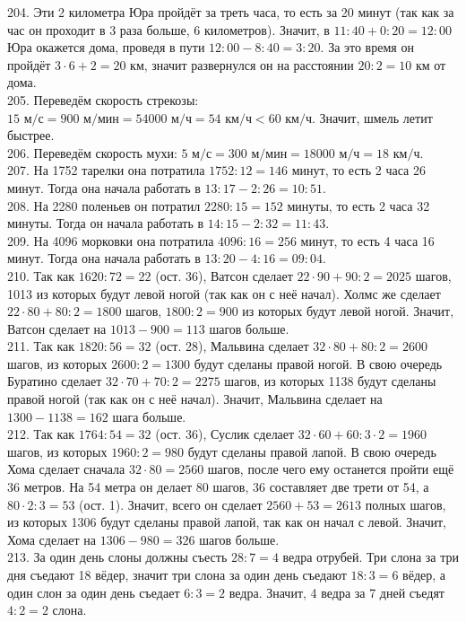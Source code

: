 204. Эти 2 километра Юра пройдёт за треть часа, то есть за 20 минут (так как за час он проходит в 3 раза больше, 6 километров). Значит, в $11:40+0:20=12:00$ Юра окажется дома, проведя в пути $12:00-8:40=3:20.$ За это время он пройдёт $3\cdot6+2=20$ км, значит развернулся он на расстоянии $20:2=10$ км от дома.\\
205. Переведём скорость стрекозы: $15\text{ м/с}=900\text{ м/мин}=54000\text{ м/ч}=54\text{ км/ч}<60\text{ км/ч}.$ Значит, шмель летит быстрее.\\
206. Переведём скорость мухи: $5\text{ м/с}=300\text{ м/мин}=18000\text{ м/ч}=18\text{ км/ч}.$\\
207. На 1752 тарелки она потратила $1752:12=146$ минут, то есть 2 часа 26 минут. Тогда она начала работать в  $13:17-2:26=10:51.$\\
208. На 2280 поленьев он потратил $2280:15=152$ минуты, то есть 2 часа 32 минуты. Тогда он начала работать в  $14:15-2:32=11:43.$\\
209. На 4096 морковки она потратила $4096:16=256$ минут, то есть 4 часа 16 минут. Тогда она начала работать в  $13:20-4:16=09:04.$\\
210. Так как $1620:72=22$ (ост. 36), Ватсон сделает $22\cdot90+90:2=2025$ шагов, 1013 из которых будут левой ногой (так как он с неё начал). Холмс же сделает $22\cdot80+80:2=1800$ шагов, $1800:2=900$ из которых будут левой ногой. Значит, Ватсон сделает на $1013-900=113$ шагов больше.\\
211. Так как $1820:56=32$ (ост. 28), Мальвина сделает $32\cdot80+80:2=2600$ шагов, из которых $2600:2=1300$ будут сделаны правой ногой. В свою очередь Буратино сделает $32\cdot70+70:2=2275$ шагов, из которых 1138 будут сделаны правой ногой (так как он с неё начал). Значит, Мальвина сделает на $1300-1138=162$ шага больше.\\
212. Так как $1764:54=32$ (ост. 36), Суслик сделает $32\cdot60+60:3\cdot2=1960$ шагов, из которых $1960:2=980$ будут сделаны правой лапой. В свою очередь Хома сделает сначала $32\cdot80=2560$ шагов, после чего ему останется пройти ещё 36 метров. На 54 метра он делает 80 шагов, 36 составляет две трети от 54, а  $80\cdot2:3=53$ (ост. 1). Значит, всего он сделает $2560+53=2613$ полных шагов, из которых 1306 будут сделаны правой лапой, так как он начал с левой. Значит, Хома сделает на $1306-980=326$ шагов больше.\\
213. За один день слоны должны съесть $28:7=4$ ведра отрубей. Три слона за три дня съедают 18 вёдер, значит три слона за один день съедают $18:3=6$ вёдер, а один слон за один день съедает $6:3=2$ ведра. Значит, 4 ведра за 7 дней съедят $4:2=2$ слона.\\

